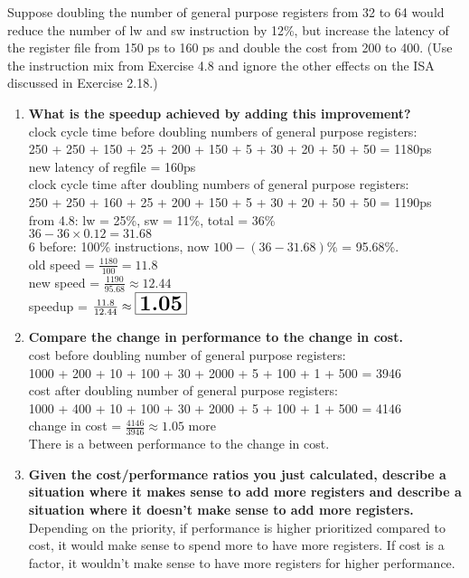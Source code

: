 \documentclass{article}
\begin{document}
    \noindent Suppose doubling the number of general purpose registers from 32 to 64 would reduce the number of lw and sw instruction by 12\%, but increase the latency of the register file from 150 ps to 160 ps and double the cost from 200 to 400. (Use the instruction mix from Exercise 4.8 and ignore the other effects on the ISA discussed in Exercise 2.18.)
    \begin{enumerate}[label=(\alph*)]
        \item \textbf{What is the speedup achieved by adding this improvement?}
        \\ 
        clock cycle time before doubling numbers of general purpose registers:\\
        250 + 250 + 150 + 25 + 200 + 150 + 5 + 30 + 20 + 50 + 50 = 1180ps\\
        new latency of regfile = 160ps\\
        clock cycle time after doubling numbers of general purpose registers:\\
        250 + 250 + 160 + 25 + 200 + 150 + 5 + 30 + 20 + 50 + 50 = 1190ps\\
        from 4.8: lw = 25\%, sw = 11\%, total = 36\%\\
        $36 - 36 \times 0.12 = 31.68$\\6
        before: 100\% instructions, now $100 - (36 - 31.68)$\% = 95.68\%.\\
        old speed = $\frac{1180}{100} = 11.8$\\
        new speed = $\frac{1190}{95.68} \approx 12.44$\\
        speedup = $\frac{11.8}{12.44} \approx \boxed{\textbf{\LARGE 1.05}}$
        \item \textbf{Compare the change in performance to the change in cost.}
        \\
        cost before doubling number of general purpose registers:\\
        1000 + 200 + 10 + 100 + 30 + 2000 + 5 + 100 + 1 + 500 = 3946\\
        cost after doubling number of general purpose registers:\\
        1000 + 400 + 10 + 100 + 30 + 2000 + 5 + 100 + 1 + 500 = 4146\\
        change in cost = $\frac{4146}{3946} \approx 1.05$ more\\
        There is a  between performance to the change in cost.
        \item \textbf{Given the cost/performance ratios you just calculated, describe a situation where it makes sense to add more registers and describe a situation where it doesn't make sense to add more registers.}
        \\
        Depending on the priority, if performance is higher prioritized compared to cost, it would make sense to spend more to have more registers. If cost is a factor, it wouldn't make sense to have more registers for higher performance.
    \end{enumerate}
\end{document}
